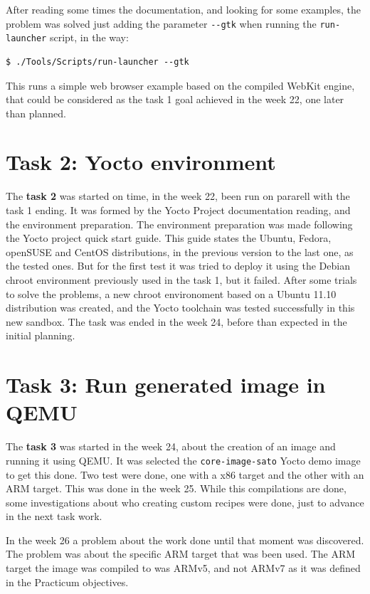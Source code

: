 \documentclass[a4paper,11pt,openany]{report}
\begin{document}
After reading some times the documentation, and looking for some examples, the problem was solved just adding the parameter \verb#--gtk# when running the \verb#run-launcher# script, in the way:

{
\footnotesize
\begin{lstlisting}
$ ./Tools/Scripts/run-launcher --gtk
\end{lstlisting}
}

This runs a simple web browser example based on the compiled WebKit engine, that could be considered as the task 1 goal achieved in the week 22, one later than planned.

\section{Task 2: Yocto environment}
The \textbf{task 2} was started on time, in the week 22, been run on pararell with the task 1 ending. It was formed by the Yocto Project documentation reading, and the environment preparation.
The environment preparation was made following the Yocto project quick start guide\cite{yocto quick start}. This guide states the Ubuntu, Fedora, openSUSE and CentOS distributions, in the previous version to the last one, as the tested ones. But for the first test it was tried to deploy it using the Debian chroot environment previously used in the task 1, but it failed. After some trials to solve the problems, a new chroot environoment based on a Ubuntu 11.10 distribution was created, and the Yocto toolchain was tested successfully in this new sandbox. The task was ended in the week 24, before than expected in the initial planning.

\section{Task 3: Run generated image in QEMU}
The \textbf{task 3} was started in the week 24, about the creation of an image and running it using QEMU. It was selected the \verb#core-image-sato# Yocto demo image to get this done. Two test were done, one with a x86 target and the other with an ARM target. This was done in the week 25. While this compilations are done, some investigations about who creating custom recipes were done, just to advance in the next task work.

In the week 26 a problem about the work done until that moment was discovered. The problem was about the specific ARM target that was been used. The ARM target the image was compiled to was ARMv5, and not ARMv7 as it was defined in the Practicum objectives.
\end{document}
